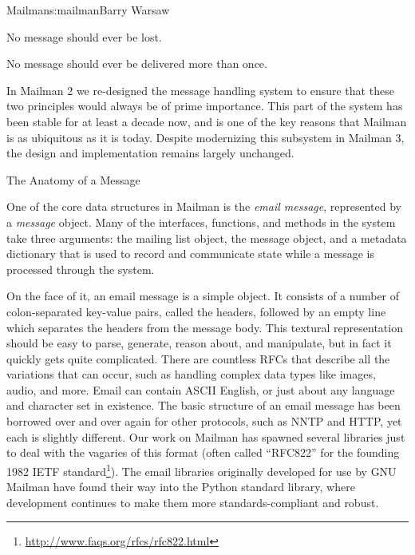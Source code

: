 \begin{aosachapter}{Mailman}{s:mailman}{Barry Warsaw}
\begin{aosaitemize}

\item No message should ever be lost.

\item No message should ever be delivered more than once.

\end{aosaitemize}

In Mailman 2 we re-designed the message handling system to ensure that
these two principles would always be of prime importance.  This part
of the system has been stable for at least a decade now, and is one of
the key reasons that Mailman is as ubiquitous as it is today.  Despite
modernizing this subsystem in Mailman 3, the design and implementation
remains largely unchanged.

\begin{aosasect1}{The Anatomy of a Message}

One of the core data structures in Mailman is the \emph{email
  message}, represented by a \emph{message} object.  Many of the
interfaces, functions, and methods in the system take three arguments:
the mailing list object, the message object, and a metadata dictionary
that is used to record and communicate state while a message is
processed through the system.

On the face of it, an email message is a simple object.  It consists
of a number of colon-separated key-value pairs, called the headers,
followed by an empty line which separates the headers from the message
body.  This textural representation should be easy to parse, generate,
reason about, and manipulate, but in fact it quickly gets quite
complicated.  There are countless RFCs that describe all the
variations that can occur, such as handling complex data types like
images, audio, and more.  Email can contain ASCII English, or just
about any language and character set in existence.  The basic
structure of an email message has been borrowed over and over again
for other protocols, such as NNTP and HTTP, yet each is slightly
different.  Our work on Mailman has spawned several libraries just to
deal with the vagaries of this format (often called ``RFC822'' for the
founding 1982 IETF
standard\footnote{\url{http://www.faqs.org/rfcs/rfc822.html}}).  The
email libraries originally developed for use by GNU Mailman have found
their way into the Python standard library, where development
continues to make them more standards-compliant and robust.


\end{aosasect1}
\end{aosachapter}
